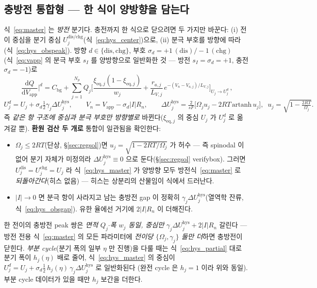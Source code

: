 \documentclass[11pt,a4paper]{article}
\newcommand{\dd}{\mathrm{d}}
\newcommand{\eq}{\mathrm{eq}}
\newcommand{\app}{\mathrm{app}}
\newcommand{\bg}{\mathrm{bg}}
\newcommand{\dis}{\mathrm{dis}}
\newcommand{\chg}{\mathrm{chg}}
\newcommand{\hys}{\mathrm{hys}}
\begin{document}
\subsection{충방전 통합형 — 한 식이 양방향을 담는다}
식~\eqref{eq:master} 는 \emph{방전} 분기다. 충전까지 한 식으로 닫으려면 두 가지만 바꾼다: (i) 전이 중심을 분기 중심
$U_j^{\dis/\chg}$(식~\eqref{eq:hys_center})으로, (ii) 분극 부호를 방향에 따라(식~\eqref{eq:hys_obspeak}). 방향
$d\in\{\dis,\chg\}$, 부호 $\sigma_d=+1\,(\dis)/-1\,(\chg)$ (식~\eqref{eq:vapp} 의 분극 부호 $s_I$ 를 양방향으로
일반화한 것 — 방전 $s_I=\sigma_d=+1$, 충전 $\sigma_d=-1$)로
\begin{equation}
\boxed{\;\frac{\dd Q}{\dd V_\app}\Big|^{d}=C_\bg+\sum_{j=1}^{N_p}Q_j\bigg[\frac{\xi_{\eq,j}(1-\xi_{\eq,j})}{w_j}
+\frac{r_{a,j}}{L_{V,j}}\,e^{-(V_n-V_{a,j})/L_{V,j}}\bigg]_{U_j\to U_j^{d}}\,,}
\label{eq:hys_master}
\end{equation}
\begin{equation*}
U_j^{d}=U_j+\sigma_d\tfrac12\gamma_j\Delta U_j^\hys,\qquad V_n=V_\app-\sigma_d|I|R_n,\qquad
\Delta U_j^\hys=\tfrac{2}{sF}\big[\Omega_j u_j-2RT\,\mathrm{artanh}\,u_j\big],\;\;u_j=\sqrt{1-\tfrac{2RT}{\Omega_j}}.
\end{equation*}
즉 \emph{같은 항 구조에 중심과 분극 부호만 방향별로} 바뀐다($\xi_{\eq,j}$ 의 중심 $U_j$ 가 $U_j^d$ 로 옮겨갈 뿐).
\textbf{환원 검산 두 개로} 통합이 일관됨을 확인한다:
\begin{itemize}[leftmargin=1.4em,itemsep=2pt]
\item $\Omega_j\le2RT$(단상, \S\ref{sec:regsol})면 $u_j=\sqrt{1-2RT/\Omega_j}$ 가 허수 — 즉 spinodal 이 없어 분기
  자체가 미정의라 $\Delta U_j^\hys\equiv0$ 으로 둔다(\S\ref{sec:regsol} verifybox). 그러면 $U_j^\dis=U_j^\chg=U_j$ 라
  식~\eqref{eq:hys_master} 가 양방향 모두 방전식~\eqref{eq:master} 로 \emph{되돌아간다}(히스 없음) — 히스는 상분리의 산물임이 식에서 드러난다.
\item $|I|\to0$ 면 분극 항이 사라지고 남는 충방전 gap 이 정확히 $\gamma_j\Delta U_j^\hys$(열역학 잔류,
  식~\eqref{eq:hys_obsgap}). 유한 율에선 거기에 $2|I|R_n$ 이 더해진다.
\end{itemize}
한 전이의 충방전 peak 쌍은 \emph{면적 $Q_j$$\cdot$폭 $w_j$ 동일, 중심만} $\gamma_j\Delta U_j^\hys+2|I|R_n$ 갈린다 —
방전 전용 식~\eqref{eq:master} 의 모든 파라미터에 \emph{전이당 $\{\Omega_j,\gamma_j\}$ 둘만 더}하면 충방전이 닫힌다.
\emph{부분 cycle}(분기 폭의 일부 $\eta$ 만 진행)을 다룰 때는 식~\eqref{eq:hys_partial} 대로 분기 폭이 $h_j(\eta)$ 배로
줄어, 식~\eqref{eq:hys_master} 의 중심이 $U_j^{d}=U_j+\sigma_d\tfrac12\,h_j(\eta)\,\gamma_j\Delta U_j^\hys$ 로 일반화된다
(완전 cycle 은 $h_j=1$ 이라 위와 동일). 부분 cycle 데이터가 있을 때만 $h_j$ 보간을 더한다.
\end{document}
